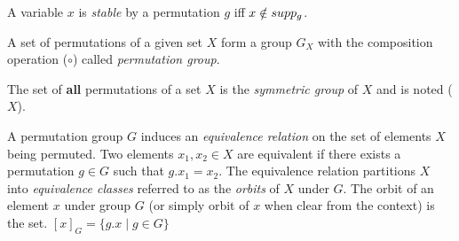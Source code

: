 \begin{definition}
 A variable $x$ is \emph{stable} by a permutation $g$  iff $x \notin supp_g$.
\end{definition}
 
\begin{definition}
 A set of permutations of a given set $X$ form a group $G_X$ with the composition operation ($\circ$) called \emph{permutation group}.
\end{definition}
\begin{definition}
The set of \textbf{all} permutations of a set $X$ is the \emph{symmetric group} of $X$ and is noted \Group($X$).
\end{definition}
%
A permutation group $G$ induces an \emph{equivalence relation} on the set of elements $X$ being
permuted. Two elements $x_1, x_2 \in X$ are equivalent if there exists a permutation $g \in G$ such that
$g.x_1 = x_2$. The equivalence relation partitions $X$ into \emph{equivalence classes} referred to
as the \emph{orbits} of $X$ under $G$. The orbit of an element $x$ under group $G$ (or simply orbit of $x$ when clear
from the context) is the set. $[x]_G = \{g.x \mid g \in G\}$
